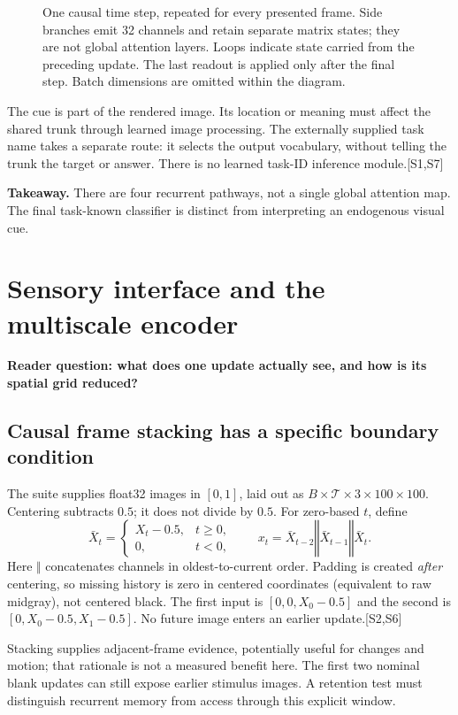 \documentclass[10pt,letterpaper]{article}
\newcommand{\cat}{\mathbin\Vert}
\newcommand{\src}[1]{\textcolor{accent}{\textsf{[#1]}}}
\newcommand{\takeaway}[1]{\par\smallskip\noindent\textbf{Takeaway.} #1}
\newcommand{\psection}[1]{\clearpage\section{#1}}
\begin{document}
\begin{figure}[h!]
\caption{One causal time step, repeated for every presented frame. Side branches emit 32 channels and retain separate matrix states; they are not global attention layers. Loops indicate state carried from the preceding update. The last readout is applied only after the final step. Batch dimensions are omitted within the diagram.}
\end{figure}

The cue is part of the rendered image. Its location or meaning must affect the shared trunk through learned image processing. The externally supplied task name takes a separate route: it selects the output vocabulary, without telling the trunk the target or answer. There is no learned task-ID inference module.\src{S1,S7}
\takeaway{There are four recurrent pathways, not a single global attention map. The final task-known classifier is distinct from interpreting an endogenous visual cue.}

\psection{Sensory interface and the multiscale encoder}
\textbf{Reader question: what does one update actually see, and how is its spatial grid reduced?}
\subsection{Causal frame stacking has a specific boundary condition}
The suite supplies float32 images in $[0,1]$, laid out as $B\times\mathcal T\times3\times100\times100$. Centering subtracts $0.5$; it does not divide by $0.5$. For zero-based $t$, define
\begin{equation}
\bar X_t=\begin{cases}X_t-0.5,&t\geq0,\\0,&t<0,\end{cases}
\qquad x_t=\bar X_{t-2}\cat\bar X_{t-1}\cat\bar X_t .
\end{equation}
Here $\cat$ concatenates channels in oldest-to-current order. Padding is created \emph{after} centering, so missing history is zero in centered coordinates (equivalent to raw midgray), not centered black. The first input is $[0,0,X_0-0.5]$ and the second is $[0,X_0-0.5,X_1-0.5]$. No future image enters an earlier update.\src{S2,S6}

Stacking supplies adjacent-frame evidence, potentially useful for changes and motion; that rationale is not a measured benefit here. The first two nominal blank updates can still expose earlier stimulus images. A retention test must distinguish recurrent memory from access through this explicit window.
\end{document}
